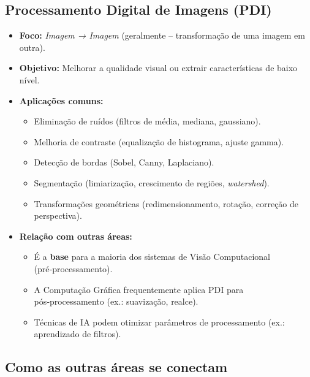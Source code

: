 \documentclass[
  portuguese,
  letterpaper,
  openany,
  oneside,
  12pt,
  a4paper]{book}
\providecommand{\tightlist}{%
  \setlength{\itemsep}{0pt}\setlength{\parskip}{0pt}}
\begin{document}
\subsection{\texorpdfstring{ Processamento Digital
de Imagens
(PDI)}{ Processamento Digital de Imagens (PDI)}}\label{processamento-digital-de-imagens-pdi}

\begin{itemize}
\tightlist
\item
  \textbf{Foco:} \emph{Imagem → Imagem} (geralmente -- transformação de
  uma imagem em outra).\\
\item
  \textbf{Objetivo:} Melhorar a qualidade visual ou extrair
  características de baixo nível.\\
\item
  \textbf{Aplicações comuns:}

  \begin{itemize}
  \tightlist
  \item
    Eliminação de ruídos (filtros de média, mediana, gaussiano).
  \item
    Melhoria de contraste (equalização de histograma, ajuste gamma).
  \item
    Detecção de bordas (Sobel, Canny, Laplaciano).
  \item
    Segmentação (limiarização, crescimento de regiões,
    \emph{watershed}).
  \item
    Transformações geométricas (redimensionamento, rotação, correção de
    perspectiva).
  \end{itemize}
\item
  \textbf{Relação com outras áreas:}

  \begin{itemize}
  \tightlist
  \item
    É a \textbf{base} para a maioria dos sistemas de Visão Computacional
    (pré‑processamento).\\
  \item
    A Computação Gráfica frequentemente aplica PDI para
    pós‑processamento (ex.: suavização, realce).\\
  \item
    Técnicas de IA podem otimizar parâmetros de processamento (ex.:
    aprendizado de filtros).
  \end{itemize}
\end{itemize}

\subsection{Como as outras áreas se
conectam}\label{como-as-outras-uxe1reas-se-conectam}
\end{document}
